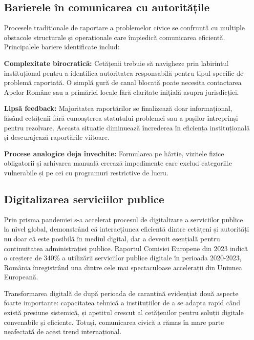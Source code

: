 \documentclass[12pt,a4paper]{report}
\begin{document}
\subsection{Barierele în comunicarea cu autoritățile}

Procesele tradiționale de raportare a problemelor civice se confruntă cu multiple obstacole structurale și operaționale care împiedică comunicarea eficientă. Principalele bariere identificate includ:

\textbf{Complexitate birocratică:} Cetățenii trebuie să navigheze prin labirintul instituțional pentru a identifica autoritatea responsabilă pentru tipul specific de problemă raportată. O simplă gură de canal blocată poate necesita contactarea Apelor Române sau  a primăriei locale fără claritate inițială asupra jurisdicției.

\textbf{Lipsă feedback:} Majoritatea raportărilor se finalizează doar   informațional, lăsând cetățenii fără cunoașterea statutului problemei sau a pașilor întreprinși pentru rezolvare. Aceasta situație diminuează încrederea în eficiența instituțională și descurajează raportările viitoare.

\textbf{Procese analogice deja învechite:} Formularea pe hârtie, vizitele fizice obligatorii și arhivarea manuală creează impedimente care exclud categoriile vulnerabile și pe cei cu programuri restrictive de lucru.

\subsection{Digitalizarea serviciilor publice}

Prin prisma pandemiei s-a accelerat procesul de digitalizare a serviciilor publice la nivel global, demonstrând că interacțiunea eficientă dintre cetățeni și autorități nu doar că este posibilă în mediul digital, dar a devenit esențială pentru continuitatea administrației publice. Raportul Comisiei Europene din 2023 indică o creștere de 340\% a utilizării serviciilor publice digitale în perioada 2020-2023, România înregistrând una dintre cele mai spectaculoase accelerații din Uniunea Europeană.

Transformarea digitală de după perioada de carantină evidențiat două aspecte foarte importante: capacitatea tehnică a instituțiilor de a se adapta rapid când există presiune sistemică, și apetitul crescut al cetățenilor pentru soluții digitale convenabile și eficiente. Totuși, comunicarea civică a rămas în mare parte neafectată de acest trend internațional.
\end{document}
